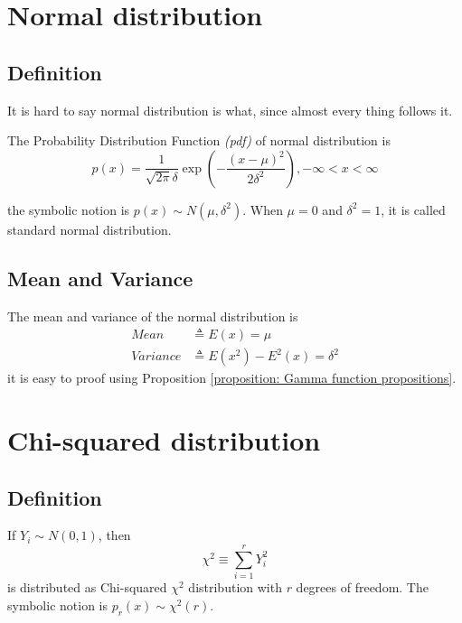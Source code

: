 \documentclass[a4paper]{article}
\begin{document}
\section{Normal distribution}

\subsection{Definition}

It is hard to say normal distribution is what, since almost every thing follows it.

The Probability Distribution Function \emph{(pdf)} of normal distribution is
\begin{equation}
    p(x) = \frac{1}{\sqrt{2\pi}\delta} \exp({-\frac{(x-\mu)^2}{2\delta^2}}), -\infty < x < \infty
\end{equation}

the symbolic notion is $p(x) \sim N(\mu, \delta^2)$.
When $\mu = 0$ and $\delta^2 = 1$, it is called standard normal distribution.

\subsection{Mean and Variance}

The mean and variance of the normal distribution is
\begin{equation*}
    \begin{align}
        Mean     & \triangleq E(x) = \mu                 \\
        Variance & \triangleq E(x^2) - E^2(x) = \delta^2
    \end{align}
\end{equation*}
it is easy to proof using Proposition \ref{proposition: Gamma function propositions}.

\newpage

\section{Chi-squared distribution}

\subsection{Definition}

If $Y_i \sim N(0, 1)$, then
\begin{equation}
    \chi^2 \equiv \sum_{i = 1}^{r} Y_i^2
\end{equation}
is distributed as Chi-squared \emph{$\chi^2$} distribution with $r$ degrees of freedom.
The symbolic notion is $p_r(x) \sim \chi^2(r)$.
\end{document}
